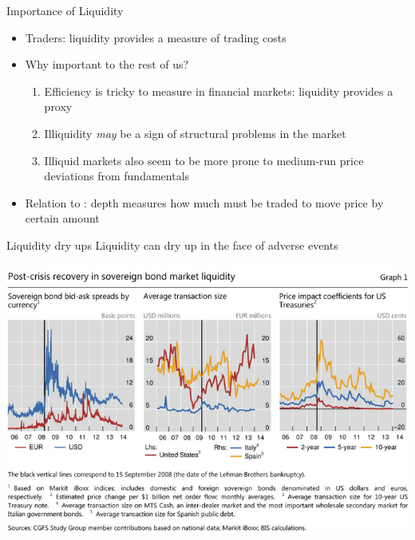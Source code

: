 \documentclass[english,10pt]{beamer}
\begin{document}
\begin{frame}{Importance of Liquidity}
\begin{itemize}
	\item Traders: liquidity provides a measure of trading costs
	\item Why important to the rest of us?
	\begin{enumerate}
		\item Efficiency is tricky to measure in financial markets: liquidity provides a proxy
		\item Illiquidity \textit{may} be a sign of structural problems in the market
		\item Illiquid markets also seem to be more prone to medium-run price deviations from fundamentals
	\end{enumerate}
	\item Relation to : depth measures how much must be traded to move price by certain amount
\end{itemize}
\end{frame}


\begin{frame}{Liquidity dry ups}
	Liquidity can dry up in the face of adverse events
	\begin{center}
		\includegraphics[scale=0.4]{pics/L2_liquiditylehman}
	\end{center}
\end{frame}
\end{document}
